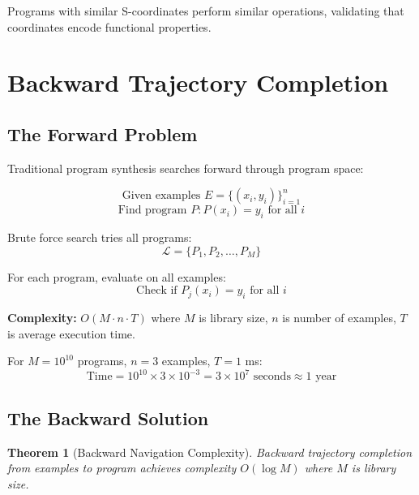 \documentclass[twocolumn,10pt]{article}
\newtheorem{theorem}{Theorem}[section]
\theoremstyle{definition}
\theoremstyle{remark}
\begin{document}
Programs with similar S-coordinates perform similar operations, validating that coordinates encode functional properties.

\section{Backward Trajectory Completion}
\label{sec:backward}

\subsection{The Forward Problem}

Traditional program synthesis searches forward through program space:

\begin{equation}
\text{Given examples } E = \{(x_i, y_i)\}_{i=1}^n
\end{equation}
\begin{equation}
\text{Find program } P: P(x_i) = y_i \text{ for all } i
\end{equation}

\noindent Brute force search tries all programs:
\begin{equation}
\mathcal{L} = \{P_1, P_2, \ldots, P_M\}
\end{equation}

For each program, evaluate on all examples:
\begin{equation}
\text{Check if } P_j(x_i) = y_i \text{ for all } i
\end{equation}

\textbf{Complexity:} $O(M \cdot n \cdot T)$ where $M$ is library size, $n$ is number of examples, $T$ is average execution time.

For $M = 10^{10}$ programs, $n = 3$ examples, $T = 1$ ms:
\begin{equation}
\text{Time} = 10^{10} \times 3 \times 10^{-3} = 3 \times 10^7 \text{ seconds} \approx 1 \text{ year}
\end{equation}

\subsection{The Backward Solution}

\begin{theorem}[Backward Navigation Complexity]
\label{thm:backward_complexity}
Backward trajectory completion from examples to program achieves complexity $O(\log M)$ where $M$ is library size.
\end{theorem}
\end{document}
